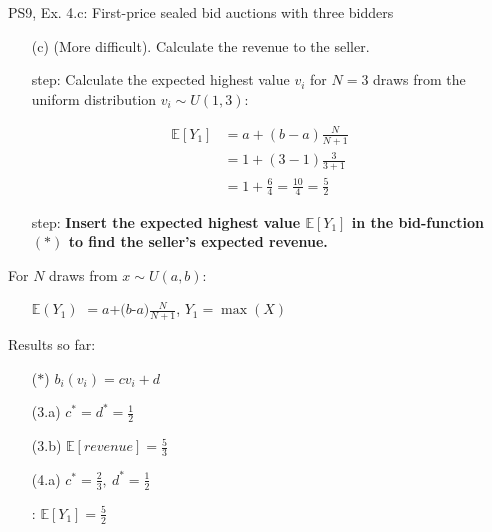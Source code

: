 \begin{frame}{PS9, Ex. 4.c: First-price sealed bid auctions with three bidders}
    \begin{itemize}
      \item[(c)] (More difficult). Calculate the revenue to the seller.
    \end{itemize}
    \vspace{-8pt}
    \begin{multicols}{2}
      \begin{itemize}
        \item[\nth{1} step:] Calculate the expected highest value $v_i$ for $N=3$ draws from the uniform distribution $v_i\sim U(1,3)$:
      \end{itemize}
      \vspace{-8pt}
      \begin{align*}
        \mathbb{E}[Y_1]&=a+(b-a)\frac{N}{N+1}\\
                       &=1+(3-1)\frac{3}{3+1}\\
                       &=1+\frac{6}{4}=\frac{10}{4}=\frac{5}{2}
      \end{align*}
      \vspace{-12pt}
      \begin{itemize}
        \item[\nth{2} step:] \textbf{Insert the expected highest value $\mathbb{E}[Y_1]$ in the bid-function $(*)$  to find the seller's expected revenue.}
      \end{itemize}
      \vfill\null\columnbreak
      For $N$ draws from $x\sim U(a, b):$
      \vspace{-6pt}
      \begin{enumerate}
        \item[$\mathbb{E}(Y_1)$] $=a$+$(b$-$a)\frac{N}{N+1}$, $Y_1=\max(X)$
      \end{enumerate}
      \vspace{-6pt}
      Results so far:
      \vspace{-6pt}
      \begin{itemize}
        \item[($*$)] $b_i(v_i) = cv_i+d$
        \item[(3.a)] $c^*=d^*=\frac{1}{2}$
        \item[(3.b)] $\mathbb{E}[revenue]=\frac{5}{3}$
        \item[(4.a)] $c^*=\frac{2}{3},\ d^*=\frac{1}{2}$
        \item[\nth{1}:] $\mathbb{E}[Y_1]=\frac{5}{2}$
      \end{itemize}
      \vfill\null
    \end{multicols}
    \vfill\null
\end{frame}
